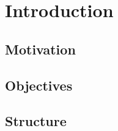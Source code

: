 \documentclass[../../main.tex]{subfiles}
\begin{document}
\chapter{Introduction}

\section{Motivation}

\section{Objectives}

\section{Structure}
\end{document}
